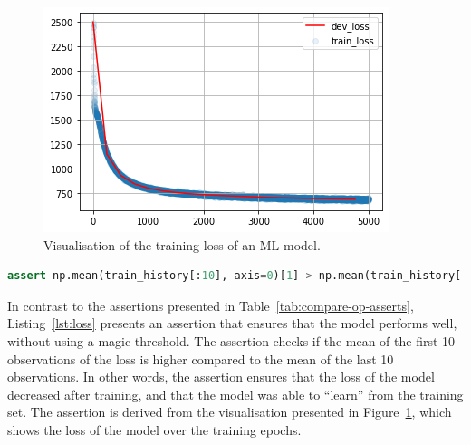 \begin{figure}
  \includegraphics[width=\linewidth]{../catalogue/select-16.png}
  \caption{Visualisation of the training loss of an ML model.}\label{fig:loss}
\end{figure}

\begin{lstlisting}[language=Python, caption={Assertion to check that the mean of the first 10 observations of the loss is higher than the mean of the last 10 observations. In other words, the assertion checks if the loss function is converging to an optimal minima.}, label={lst:loss}]
assert np.mean(train_history[:10], axis=0)[1] > np.mean(train_history[-10:], axis=0)[1], "The model didn't converge."
\end{lstlisting}

In contrast to the assertions presented in Table~\ref{tab:compare-op-asserts}, Listing~\ref{lst:loss} presents an assertion that ensures that the model performs well, without using a magic threshold. The assertion checks if the mean of the first 10 observations of the loss is higher compared to the mean of the last 10 observations. In other words, the assertion ensures that the loss of the model decreased after training, and that the model was able to ``learn'' from the training set. The assertion is derived from the visualisation presented in Figure~\ref{fig:loss}, which shows the loss of the model over the training epochs.

